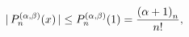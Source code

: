 \[|\mathop{P^{(\alpha,\beta)}_{n}\/}\nolimits\!\left(x\right)|\leq\mathop{P^{(%
\alpha,\beta)}_{n}\/}\nolimits\!\left(1\right)=\frac{\left(\alpha+1\right)_{n}%
}{n!},\]